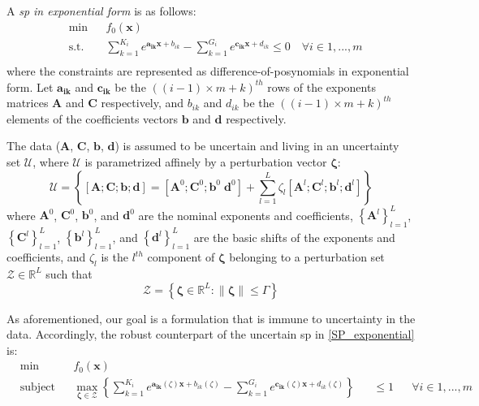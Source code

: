 A \emph{\gls{sp} in exponential form} is as follows:
\begin{equation}
    \label{SP_exponential}
\begin{aligned}
	& \min && f_0\left(\mathbf{x}\right) \\
	& \text{s.t.} && \textstyle{\sum}_{k=1}^{K_i}e^{\mathbf{a_{ik}}\mathbf{x} + b_{ik}} - \textstyle{\sum}_{k=1}^{G_i}e^{\mathbf{c_{ik}}\mathbf{x} + d_{ik}} \leq 0 \quad \forall i \in 1,...,m\\
\end{aligned}
\end{equation}
where the constraints are represented as difference-of-posynomials in exponential form.
Let $\mathbf{a_{ik}}$ and $\mathbf{c_{ik}}$ be the $((i-1)\times m + k)^{th}$ rows of the exponents matrices
$\mathbf{A}$ and $\mathbf{C}$ respectively, and $b_{ik}$ and $d_{ik}$ be the $((i-1)\times m + k)^{th}$ elements
of the coefficients vectors $\mathbf{b}$ and $\mathbf{d}$ respectively.

The data ($\mathbf{A}$, $\mathbf{C}$, $\mathbf{b}$, $\mathbf{d}$) is assumed to be uncertain and
living in an uncertainty set $\mathcal{U}$, where $\mathcal{U}$ is parametrized
affinely by a perturbation vector $\mathbf{\zeta}$:
\begin{equation}
\mathcal{U} = \left\{\left[\mathbf{A};\mathbf{C};\mathbf{b};\mathbf{d}\right] = \left[\mathbf{A}^0;\mathbf{C}^0;\mathbf{b}^0\;\mathbf{d}^0 \right] + \textstyle{\sum_{l=1}^{L}\zeta_l\left[\mathbf{A}^l;\mathbf{C}^l;\mathbf{b}^l; \mathbf{d}^l\right]}\right\}
\label{Data}
\end{equation}
where $\mathbf{A}^0$, $\mathbf{C}^0$, $\mathbf{b}^0$, and $\mathbf{d}^0$ are the nominal exponents and coefficients,
$\left\{\mathbf{A}^l\right\}_{l=1}^{L}$, $\left\{\mathbf{C}^l\right\}_{l=1}^{L}$, $\left\{\mathbf{b}^l\right\}_{l=1}^{L}$, and
$\left\{\mathbf{d}^l\right\}_{l=1}^{L}$ are the basic shifts of the exponents and coefficients,
and $\zeta_l$ is the $l^{th}$ component of $\mathbf{\zeta}$ belonging to a perturbation set $\mathcal{Z} \in \mathbb{R}^L$ such that
\begin{equation}
\mathcal{Z} = \left\{ \mathbf{\zeta} \in \mathbb{R}^L: \left\lVert \mathbf{\zeta} \right\rVert \leq \Gamma \right\}
\label{perturbation_set}
\end{equation}

As aforementioned, our goal is a formulation that is immune to
uncertainty in the data. Accordingly, the robust counterpart
of the uncertain \gls{sp} in \eqref{SP_exponential} is:
\begin{equation}
\begin{aligned}
& \min &&f_0\left(\mathbf{x}\right)\\
& \text{subject to} &&\max_{\mathbf{\zeta} \in \mathcal{Z}} \left\{\textstyle{\sum}_{k=1}^{K_i}e^{\mathbf{a_{ik}}\left(\zeta\right)\mathbf{x} + b_{ik}\left(\zeta\right)} - \textstyle{\sum}_{k=1}^{G_i}e^{\mathbf{c_{ik}}\left(\zeta\right)\mathbf{x} + d_{ik}\left(\zeta\right)}\right\} &&\leq 1 &&\forall i \in 1,...,m\\
\end{aligned}
\label{SP_counterparts_finite}
\end{equation}

